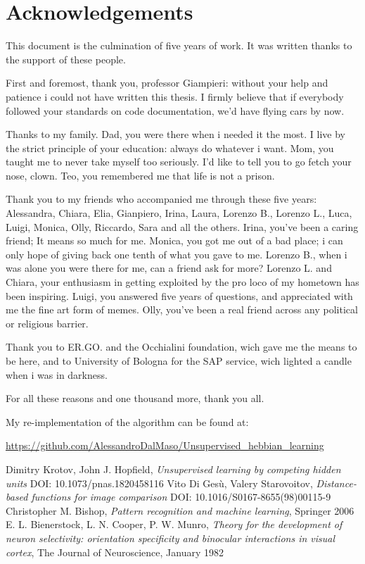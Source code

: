 \documentclass[a4paper]{report}
\begin{document}
\chapter{Acknowledgements}
This document is the culmination of five years of work. It was written thanks to the support of these people.

First and foremost, thank you, professor Giampieri: without your help and patience i could not have written this thesis. I firmly believe that if everybody followed your standards on code documentation, we'd have flying cars by now.

Thanks to my family. Dad, you were there when i needed it the most. I live by the strict principle of your education: always do whatever i want. Mom, you taught me to never take myself too seriously. I'd like to tell you to go fetch your nose, clown. Teo, you remembered me that life is not a prison.

Thank you to my friends who accompanied me through these five years: Alessandra, Chiara, Elia, Gianpiero, Irina, Laura, Lorenzo B., Lorenzo L., Luca, Luigi, Monica, Olly, Riccardo, Sara and all the others. Irina, you've been a caring friend; It means so much for me. Monica, you got me out of a bad place; i can only hope of giving back one tenth of what you gave to me. Lorenzo B., when i was alone you were there for me, can a friend ask for more? Lorenzo L. and Chiara, your enthusiasm in getting exploited by the pro loco of my hometown has been inspiring. Luigi, you answered five years of questions, and appreciated with me the fine art form of memes. Olly, you've been a real friend across any political or religious barrier.

Thank you to ER.GO. and the Occhialini foundation, wich gave me the means to be here, and to University of Bologna for the SAP service, wich lighted a candle when i was in darkness.

For all these reasons and one thousand more, thank you all.
\begin{thebibliography}{9}
My re-implementation of the algorithm can be found at:

\url{https://github.com/AlessandroDalMaso/Unsupervised\_hebbian\_learning}

Dimitry Krotov, John J. Hopfield, \textit{Unsupervised learning by competing hidden units}
DOI: 10.1073/pnas.1820458116
Vito Di Gesù, Valery Starovoitov, \textit{Distance-based functions for image comparison}
DOI: 10.1016/S0167-8655(98)00115-9
Christopher M. Bishop, \textit{Pattern recognition and machine learning}, Springer 2006
E. L. Bienerstock, L. N. Cooper, P. W. Munro, \textit{Theory for the development of neuron selectivity: orientation specificity and binocular interactions in visual cortex}, The Journal of Neuroscience, January 1982
\end{thebibliography}
\end{document}

